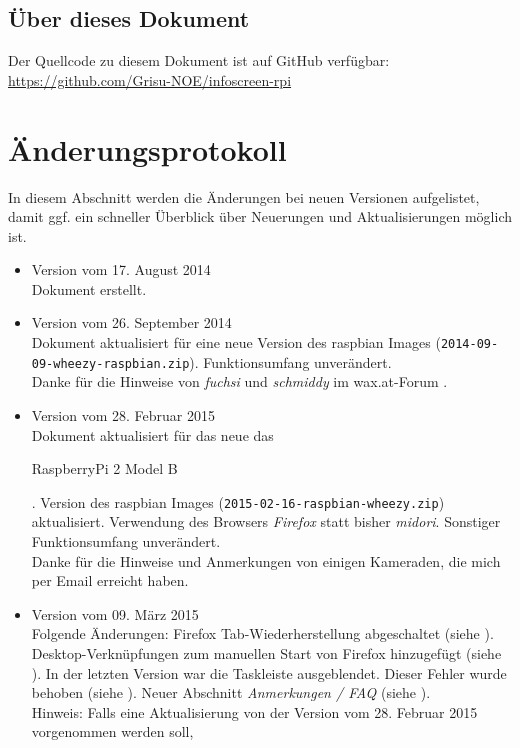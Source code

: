 \subsection{Über dieses Dokument}
\label{sec:github}
Der Quellcode zu diesem Dokument ist auf GitHub verfügbar:\\
\url{https://github.com/Grisu-NOE/infoscreen-rpi}

\section{Änderungsprotokoll}
In diesem Abschnitt werden die Änderungen bei neuen Versionen aufgelistet, damit ggf. ein schneller Überblick über Neuerungen und Aktualisierungen möglich ist.
\begin{itemize}
	\item {Version vom 17. August 2014\\ Dokument erstellt.}
	\item {Version vom 26. September 2014\\ Dokument aktualisiert für eine neue Version des raspbian Images (\lstinline|2014-09-09-wheezy-raspbian.zip|). Funktionsumfang unverändert.\\
		Danke für die Hinweise von \textit{fuchsi} und \textit{schmiddy} im wax.at-Forum \cite{wax1}.}
	\item {Version vom 28. Februar 2015\\ Dokument aktualisiert für das neue das \begin{em}RaspberryPi 2 Model B\end{em}. Version des raspbian Images (\lstinline|2015-02-16-raspbian-wheezy.zip|) aktualisiert. Verwendung des Browsers \textit{Firefox} statt bisher \textit{midori}. Sonstiger Funktionsumfang unverändert.\\
		Danke für die Hinweise und Anmerkungen von einigen Kameraden, die mich per Email erreicht haben.
		}
	\item {Version vom 09. März 2015\\ Folgende Änderungen: 
		Firefox Tab-Wiederherstellung abgeschaltet (siehe ). 
		Desktop-Verknüpfungen zum manuellen Start von Firefox hinzugefügt (siehe ).
		In der letzten Version war die Taskleiste ausgeblendet. Dieser Fehler wurde behoben (siehe ).
		Neuer Abschnitt \textit{Anmerkungen / FAQ} (siehe ).\\
		Hinweis: Falls eine Aktualisierung von der Version vom 28. Februar 2015 vorgenommen werden soll, 
}
\end{itemize}
